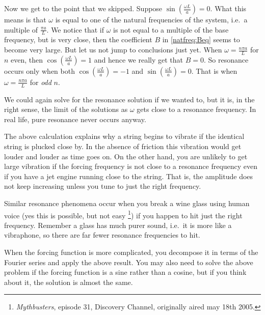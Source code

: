 Now we get to the point that we skipped.  Suppose 
$\sin ( \frac{\omega L}{a} ) = 0$.  What this means is that
$\omega$ is equal to one of the natural frequencies of the system,
i.e.\ a multiple of $\frac{\pi a}{L}$.  We notice that if $\omega$
is not equal to a multiple of the base frequency, but is very close,
then the coefficient $B$ in \eqref{natfreq:Beq} seems to
become very large.  But let us not jump to conclusions just yet.
When $\omega = \frac{n \pi a}{L}$
for $n$ even, then $\cos (\frac{\omega L}{a}) = 1$ and hence we really get that
$B=0$.  So resonance occurs only when 
both $\cos (\frac{\omega L}{a}) = -1$ and
$\sin (\frac{\omega L}{a}) = 0$.  That is when $\omega = \frac{n \pi a }{L}$
for \emph{odd} $n$.

We could again solve for the resonance solution if we wanted to, but it is, in the right sense, the limit of the solutions as $\omega$ gets
close to a resonance frequency.
In real life, pure resonance never occurs anyway.

The above calculation explains why a string begins to vibrate if the
identical string is plucked close by.  In the absence of friction this vibration
would get louder and louder as time goes on.
On the other hand, you are unlikely to get large vibration if the forcing 
frequency is not close to a resonance frequency even if you have a jet engine
running close to
the string.  That is, the amplitude does not keep
increasing unless you tune to just the right frequency.

Similar resonance phenomena occur when you break a wine glass using human
voice (yes
this is possible, but not easy%
\footnote{\emph{Mythbusters}, episode 31, Discovery Channel, originally aired
may 18th 2005.}) if you happen to hit just the right
frequency.  Remember a glass has much purer sound, i.e.\ it is more like a
vibraphone, so there are far fewer resonance frequencies to hit.

When the forcing function is more complicated, you decompose it in terms of
the Fourier series and apply the above result.  You may also need to solve
the above problem if the forcing function is a sine rather than a cosine,
but if you think about it, the solution is almost the same.


